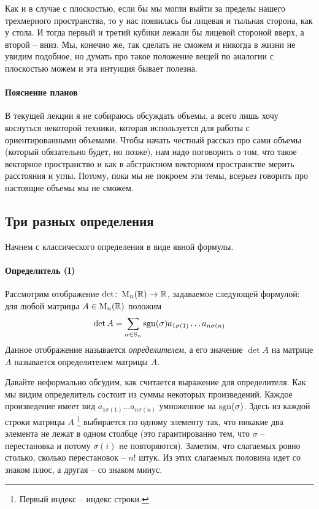 Как и в случае с плоскостью, если бы мы могли выйти за пределы нашего трехмерного пространства, то у нас появилась бы лицевая и тыльная сторона, как у стола.
И тогда первый и третий кубики лежали бы лицевой стороной вверх, а второй -- вниз.
Мы, конечно же, так сделать не сможем и никогда в жизни не увидим подобное, но думать про такое положение вещей по аналогии с плоскостью можем и эта интуиция бывает полезна.

\paragraph{Пояснение планов}

В текущей лекции я не собираюсь обсуждать объемы, а всего лишь хочу коснуться некоторой техники, которая используется для работы с ориентированными объемами.
Чтобы начать честный рассказ про сами объемы (который обязательно будет, но позже), нам надо поговорить о том, что такое векторное пространство и как в абстрактном векторном пространстве мерить расстояния и углы.
Потому, пока мы не покроем эти темы, всерьез говорить про настоящие объемы мы не сможем.

\subsection{Три разных определения}

Начнем с классического определения в виде явной формулы.

\paragraph{Определитель (I)}

Рассмотрим отображение $\det \colon \operatorname{M}_{n}(\mathbb R)\to \mathbb R$, задаваемое следующей формулой: для любой матрицы $A\in\operatorname{M}_{n}(\mathbb R)$ положим
\[
\det A = \sum_{\sigma \in \operatorname{S}_{n}} \operatorname{sgn}(\sigma) a_{1\sigma(1)}\ldots a_{n\sigma(n)}
\]
Данное отображение называется {\it определителем}, а его значение $\det A$ на матрице $A$ называется определителем матрицы $A$.

Давайте неформально обсудим, как считается выражение для определителя.
Как мы видим определитель состоит из суммы некоторых произведений.
Каждое произведение имеет вид $a_{1\sigma(1)}\ldots a_{n\sigma(n)}$ умноженное на $\operatorname{sgn}(\sigma)$.
Здесь из каждой строки матрицы $A$%
\footnote{Первый индекс -- индекс строки.}
выбирается по одному элементу так, что никакие два элемента не лежат в одном столбце (это гарантированно тем, что $\sigma$ -- перестановка и потому $\sigma(i)$ не повторяются).
Заметим, что слагаемых ровно столько, сколько перестановок -- $n!$ штук.
Из этих слагаемых половина идет со знаком плюс, а другая -- со знаком минус.

